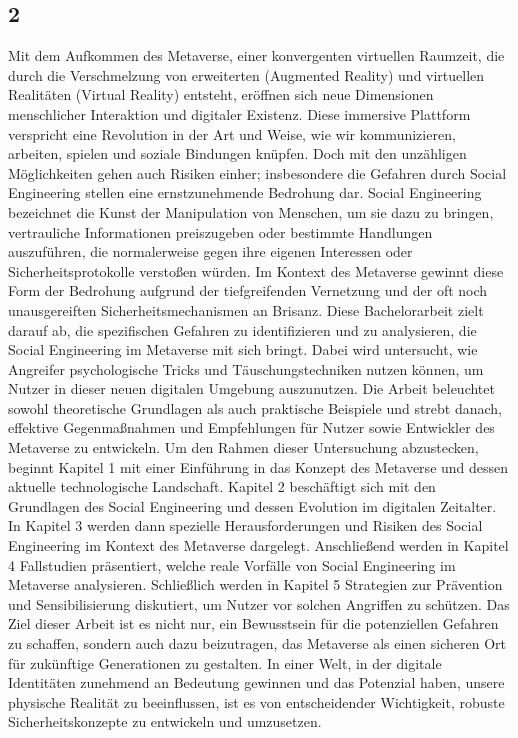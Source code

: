 \subsection*{2}
Mit dem Aufkommen des Metaverse, einer konvergenten virtuellen Raumzeit, die durch die Verschmelzung von erweiterten (Augmented Reality) und virtuellen Realitäten (Virtual Reality) entsteht, eröffnen sich neue Dimensionen menschlicher Interaktion und digitaler Existenz. Diese immersive Plattform verspricht eine Revolution in der Art und Weise, wie wir kommunizieren, arbeiten, spielen und soziale Bindungen knüpfen. Doch mit den unzähligen Möglichkeiten gehen auch Risiken einher; insbesondere die Gefahren durch Social Engineering stellen eine ernstzunehmende Bedrohung dar.
Social Engineering bezeichnet die Kunst der Manipulation von Menschen, um sie dazu zu bringen, vertrauliche Informationen preiszugeben oder bestimmte Handlungen auszuführen, die normalerweise gegen ihre eigenen Interessen oder Sicherheitsprotokolle verstoßen würden. Im Kontext des Metaverse gewinnt diese Form der Bedrohung aufgrund der tiefgreifenden Vernetzung und der oft noch unausgereiften Sicherheitsmechanismen an Brisanz.
Diese Bachelorarbeit zielt darauf ab, die spezifischen Gefahren zu identifizieren und zu analysieren, die Social Engineering im Metaverse mit sich bringt. Dabei wird untersucht, wie Angreifer psychologische Tricks und Täuschungstechniken nutzen können, um Nutzer in dieser neuen digitalen Umgebung auszunutzen. Die Arbeit beleuchtet sowohl theoretische Grundlagen als auch praktische Beispiele und strebt danach, effektive Gegenmaßnahmen und Empfehlungen für Nutzer sowie Entwickler des Metaverse zu entwickeln.
Um den Rahmen dieser Untersuchung abzustecken, beginnt Kapitel 1 mit einer Einführung in das Konzept des Metaverse und dessen aktuelle technologische Landschaft. Kapitel 2 beschäftigt sich mit den Grundlagen des Social Engineering und dessen Evolution im digitalen Zeitalter. In Kapitel 3 werden dann spezielle Herausforderungen und Risiken des Social Engineering im Kontext des Metaverse dargelegt. Anschließend werden in Kapitel 4 Fallstudien präsentiert, welche reale Vorfälle von Social Engineering im Metaverse analysieren. Schließlich werden in Kapitel 5 Strategien zur Prävention und Sensibilisierung diskutiert, um Nutzer vor solchen Angriffen zu schützen.
Das Ziel dieser Arbeit ist es nicht nur, ein Bewusstsein für die potenziellen Gefahren zu schaffen, sondern auch dazu beizutragen, das Metaverse als einen sicheren Ort für zukünftige Generationen zu gestalten. In einer Welt, in der digitale Identitäten zunehmend an Bedeutung gewinnen und das Potenzial haben, unsere physische Realität zu beeinflussen, ist es von entscheidender Wichtigkeit, robuste Sicherheitskonzepte zu entwickeln und umzusetzen.

